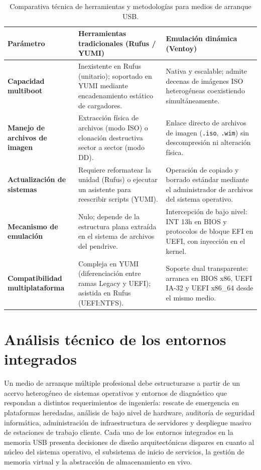 \documentclass[12pt]{article}
\begin{document}
\begin{table}[htbp]
\centering
\small
\renewcommand{\arraystretch}{1.15}
\renewcommand{\tabularxcolumn}[1]{m{#1}}
\setlength{\emergencystretch}{1.5em}
\caption{Comparativa técnica de herramientas y metodologías para medios de arranque USB.}
\label{tab:comparativaHerramientasMultiboot}
\begin{tabularx}{\textwidth}{>{\centering\arraybackslash}m{2.8cm} X X}
\toprule
\textbf{Parámetro} & \textbf{Herramientas tradicionales (Rufus / YUMI)} & \textbf{Emulación dinámica (Ventoy)} \\
\midrule
\textbf{Capacidad multiboot} & Inexistente en Rufus (unitario); soportado en YUMI mediante encadenamiento estático de cargadores. & Nativa y escalable; admite decenas de imágenes ISO heterogéneas coexistiendo simultáneamente. \\
\addlinespace
\textbf{Manejo de archivos de imagen} & Extracción física de archivos (modo ISO) o clonación destructiva sector a sector (modo DD). & Enlace directo de archivos de imagen (\texttt{.iso}, \texttt{.wim}) sin descompresión ni alteración física. \\
\addlinespace
\textbf{Actualización de sistemas} & Requiere reformatear la unidad (Rufus) o ejecutar un asistente para reescribir scripts (YUMI). & Operación de copiado y borrado estándar mediante el administrador de archivos del sistema operativo. \\
\addlinespace
\textbf{Mecanismo de emulación} & Nulo; depende de la estructura plana extraída en el sistema de archivos del pendrive. & Intercepción de bajo nivel: INT 13h en BIOS y protocolos de bloque EFI en UEFI, con inyección en el kernel. \\
\addlinespace
\textbf{Compatibilidad multiplataforma} & Compleja en YUMI (diferenciación entre ramas Legacy y UEFI); asistida en Rufus (UEFI:NTFS). & Soporte dual transparente: arranca en BIOS x86, UEFI IA-32 y UEFI x86\_64 desde el mismo medio. \\
\bottomrule
\end{tabularx}
\end{table}

\section{Análisis técnico de los entornos integrados}
\label{sec:analisisEntornos}

Un medio de arranque múltiple profesional debe estructurarse a partir de un acervo heterogéneo de sistemas operativos y entornos de diagnóstico que respondan a distintos requerimientos de ingeniería: rescate de emergencia en plataformas heredadas, análisis de bajo nivel de hardware, auditoría de seguridad informática, administración de infraestructura de servidores y despliegue masivo de estaciones de trabajo cliente. Cada uno de los entornos integrados en la memoria USB presenta decisiones de diseño arquitectónicas dispares en cuanto al núcleo del sistema operativo, el subsistema de inicio de servicios, la gestión de memoria virtual y la abstracción de almacenamiento en vivo.
\end{document}
